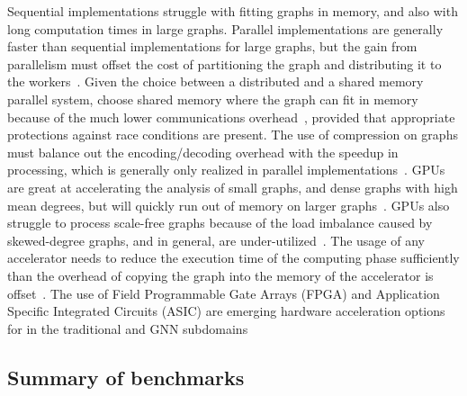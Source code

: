 Sequential implementations struggle with fitting graphs in memory, and also with long computation times in large graphs. 
Parallel implementations are generally faster than sequential implementations for large graphs, but the gain from parallelism must offset the cost of partitioning the graph and distributing it to the workers~\cite{Kepner2015}.
Given the choice between a distributed and a shared memory parallel system, choose shared memory where the graph can fit in memory because of the much lower communications overhead~\cite{Beamer2015}, provided that appropriate protections against race conditions are present.
The use of compression on graphs must balance out the encoding/decoding overhead with the speedup in processing, which is generally only realized in parallel implementations~\cite{Shun2015}.
GPUs are great at accelerating the analysis of small graphs, and dense graphs with high mean degrees, but will quickly run out of memory on larger graphs~\cite{Sundaram2015, Zhou2024}. 
GPUs also struggle to process scale-free graphs because of the load imbalance caused by skewed-degree graphs, and in general, are under-utilized~\cite{Wu2021a}.
The usage of any accelerator needs to reduce the execution time of the computing phase sufficiently than the overhead of copying the graph into the memory of the accelerator is offset~\cite{Azad2021}.
The use of Field Programmable Gate Arrays (FPGA) and Application Specific Integrated Circuits (ASIC) are emerging hardware acceleration options for \gai in the traditional and GNN subdomains~\cite{Aananthakrishnan2020, Zhang2023} 


\subsection{Summary of \gai benchmarks}